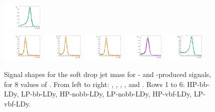 \begin{figure}[htbp]
  \includegraphics[width=0.18\textwidth]{fig/2Dfit/templateSignalVsMX_fromDC_WprToWH_MJJ_mu_HP_vbf_LDy.pdf}\\
  \includegraphics[width=0.18\textwidth]{fig/2Dfit/templateSignalVsMX_fromDC_GbuToWW_MJJ_mu_LP_vbf_LDy.pdf}
  \includegraphics[width=0.18\textwidth]{fig/2Dfit/templateSignalVsMX_fromDC_RadToWW_MJJ_mu_LP_vbf_LDy.pdf}
  \includegraphics[width=0.18\textwidth]{fig/2Dfit/templateSignalVsMX_fromDC_ZprToWW_MJJ_mu_LP_vbf_LDy.pdf}
  \includegraphics[width=0.18\textwidth]{fig/2Dfit/templateSignalVsMX_fromDC_WprToWZ_MJJ_mu_LP_vbf_LDy.pdf}
  \includegraphics[width=0.18\textwidth]{fig/2Dfit/templateSignalVsMX_fromDC_WprToWH_MJJ_mu_LP_vbf_LDy.pdf}\\
  \caption{
    Signal shapes for the soft drop jet mass \MJ for \ggF- and \DY-produced signals, for 8 values of \MX.
    From left to right: \GBulktoWW, \RadtoWW, \ZprtoWW, \WprtoWZ, and \WprtoWH.
    Rows 1 to 6: HP-bb-LDy, LP-bb-LDy, HP-nobb-LDy, LP-nobb-LDy, HP-vbf-LDy, LP-vbf-LDy.
  }
  \label{fig:MJJShapes_NonVBF_LDy_Run2}
\end{figure}

